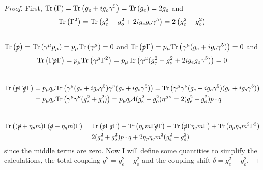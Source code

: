 \documentclass[12pt]{article}
\newcommand{\tr}[1]{\mathrm{Tr} \left( #1 \right)}
\begin{document}
\begin{proof}

First, $\tr{ \Gamma } = \tr{ \gs + i \gp \gamma^5 } = \tr { \gs } = 2 \gs$ and
 \[\tr{ \Gamma^2 } = \tr{ \gs^2 - \gp^2 + 2 i \gs \gp \gamma^5 } =  2 \left( \gs^2 - \gp^2 \right)\] 
\bigskip\\
$ \tr{ \slashed{p} } = \tr{ \gamma^\mu p_\mu } = p_\mu \tr{ \gamma^\mu} = 0 $ and $ \tr{ \slashed{p} \Gamma } = p_\mu \tr{ \gamma^\mu (\gs + i \gp \gamma^5 ) } = 0$ and 
\[ \tr{ \Gamma \slashed{p} \Gamma } = p_\mu \tr{ \gamma^\mu \Gamma^2} = p_\mu \tr{ \gamma^\mu (\gs^2 - \gp^2 + 2 i \gs \gp \gamma^5) } = 0 \]
\bigskip\\
\begin{align*} 
\tr{ \slashed{p} \Gamma \slashed{q} \Gamma } & = p_\mu q_\nu \tr{ \gamma^\mu (\gs + i \gp \gamma^5 ) \gamma^\nu ( \gs + i \gp \gamma^5 ) }  = \tr{ \gamma^\mu \gamma^\nu ( \gs - i \gp \gamma^5) (\gs + i \gp \gamma^5) } 
\\
& = p_{\mu} q_{\nu} \tr{ \gamma^\mu \gamma^\nu (\gs^2 + \gp^2) } = p_\mu q_\nu 4 (\gs^2 + \gp^2)\eta^{\mu \nu} = 2 (\gs^2 + \gp^2)  p \cdot q 
\end{align*}
\bigskip\\
\begin{align*}
\tr{ (\slashed{p} + \eta_p m) \Gamma (\slashed{q} + \eta_q m) \Gamma } & = \tr{ \slashed{p} \Gamma \slashed{q} \Gamma } + \tr{ \eta_p m \Gamma \slashed{q} \Gamma } + \tr{ \slashed{p} \Gamma \eta_q m \Gamma } + \tr{ \eta_p \eta_q m^2 \Gamma^2 } 
\\
& = 2 ( \gs^2 + \gp^2) p \cdot q + 2 \eta_p \eta_q m^2 (\gs^2 - \gp^2) 
\end{align*}
since the middle terms are zero. Now I will define some quantities to simplify the calculations, the total coupling $g^2 = g_e^2 + g_o^2$ and the coupling shift $\delta = g_e^2 - g_o^2$.  
\end{proof}
\end{document}
